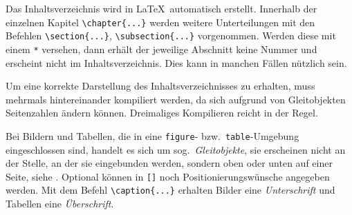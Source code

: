 Das Inhaltsverzeichnis wird in \LaTeX\ automatisch erstellt.
Innerhalb der einzelnen Kapitel \verb|\chapter{...}| werden weitere Unterteilungen mit den Befehlen \verb|\section{...}|, \verb|\subsection{...}| \usw vorgenommen.
Werden diese mit einem \verb|*| versehen, dann erhält der jeweilige Abschnitt keine Nummer und erscheint nicht im Inhaltsverzeichnis.
Dies kann in manchen Fällen nützlich sein.

Um eine korrekte Darstellung des Inhaltsverzeichnisses zu erhalten, muss \ggf mehrmals hintereinander kompiliert werden, da sich aufgrund von
Gleitobjekten Seitenzahlen ändern können.
Dreimaliges Kompilieren reicht in der Regel.

Bei Bildern und Tabellen, die in eine \verb|figure|- bzw.\ \verb|table|-Umgebung eingeschlossen sind, handelt es sich um sog.\ \emph{Gleitobjekte}, \dah sie erscheinen nicht an der Stelle, an der sie eingebunden werden, sondern oben oder unten auf einer Seite, siehe \zB {}.
Optional können in \verb|[]| noch Positionierungswünsche angegeben werden.
Mit dem Befehl \verb|\caption{...}| erhalten Bilder eine \emph{Unterschrift} und Tabellen eine \emph{Überschrift}.

